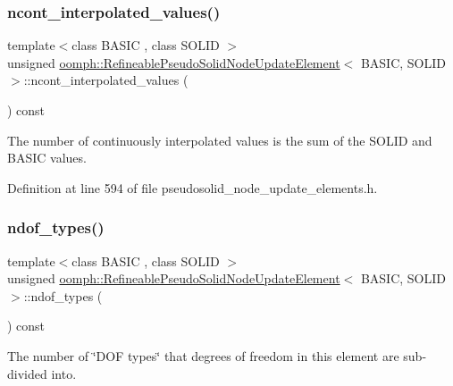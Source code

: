 \subsubsection{\texorpdfstring{ncont\+\_\+interpolated\+\_\+values()}{ncont\_interpolated\_values()}}
{\footnotesize\ttfamily template$<$class B\+A\+S\+IC , class S\+O\+L\+ID $>$ \\
unsigned \hyperlink{classoomph_1_1RefineablePseudoSolidNodeUpdateElement}{oomph\+::\+Refineable\+Pseudo\+Solid\+Node\+Update\+Element}$<$ B\+A\+S\+IC, S\+O\+L\+ID $>$\+::ncont\+\_\+interpolated\+\_\+values (\begin{DoxyParamCaption}{ }\end{DoxyParamCaption}) const\hspace{0.3cm}{\ttfamily [inline]}}



The number of continuously interpolated values is the sum of the S\+O\+L\+ID and B\+A\+S\+IC values. 



Definition at line 594 of file pseudosolid\+\_\+node\+\_\+update\+\_\+elements.\+h.

\mbox{\label{classoomph_1_1RefineablePseudoSolidNodeUpdateElement_a04cbdc63d7d79c04ed80b7a0903e8199}} 
\subsubsection{\texorpdfstring{ndof\+\_\+types()}{ndof\_types()}}
{\footnotesize\ttfamily template$<$class B\+A\+S\+IC , class S\+O\+L\+ID $>$ \\
unsigned \hyperlink{classoomph_1_1RefineablePseudoSolidNodeUpdateElement}{oomph\+::\+Refineable\+Pseudo\+Solid\+Node\+Update\+Element}$<$ B\+A\+S\+IC, S\+O\+L\+ID $>$\+::ndof\+\_\+types (\begin{DoxyParamCaption}{ }\end{DoxyParamCaption}) const\hspace{0.3cm}{\ttfamily [inline]}}



The number of \char`\"{}\+D\+O\+F types\char`\"{} that degrees of freedom in this element are sub-\/divided into. 



